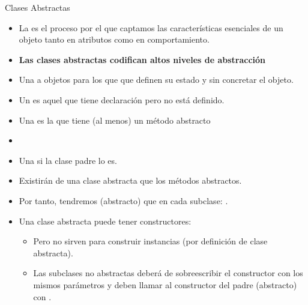 \documentclass[10pt, envcountsect , spanish]{beamer}
\begin{document}
\begin{frame}{Clases Abstractas} 

\begin{itemize}
\item La  es el proceso por el que captamos las características esenciales de un objeto tanto en atributos como en comportamiento.

\item \textbf{Las clases abstractas codifican altos niveles de abstracción}

\item Una  a objetos para los que  que definen su estado y   sin concretar el objeto.

\item Un  es aquel que tiene declaración pero no está  definido.


\item Una  es la que tiene (al menos) un método abstracto

\item 
{}



\item Una  si la clase padre lo es.


\item Existirán  de una clase abstracta  que  los métodos abstractos.

\item Por tanto, tendremos  (abstracto) que  en cada subclase:
.


\item Una clase abstracta puede tener constructores:
\begin{itemize}
\item Pero no sirven para construir instancias (por definición de clase abstracta).
\item Las subclases no abstractas deberá de sobreescribir el constructor  con los mismos parámetros  y deben llamar al constructor del padre (abstracto) con .
\end{itemize}

\end{itemize}

\end{frame}
\end{document}
